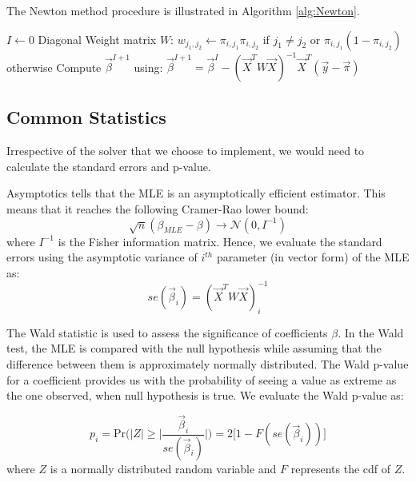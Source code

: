 The Newton method procedure is illustrated in Algorithm \ref{alg:Newton}.
\begin{algorithm}
\begin{algorithmic}[1]
    \State $I \leftarrow 0$
    \Repeat
        \State Diagonal Weight matrix $W$: $w_{j_1,j_2} \leftarrow \pi_{i,j_1}\pi_{i,j_2}$ if $j_1 \neq j_2$ or $\pi_{i,j_1}(1-\pi_{i,j_2})$ otherwise
        \State Compute $\vec{\beta}^{I+1}$  using:
        \State $\vec{\beta}^{I+1} =\vec{\beta}^{I} - (\vec{X}^{T} W \vec{X})^{-1} \vec{X}^{T} (\vec{y} - \vec{\pi}) $
\end{algorithmic}
\label{alg:Newton}
\end{algorithm}

\subsection{Common Statistics}\label{sec:stats}
Irrespective of the solver that we choose to implement, we would need to calculate the standard errors and p-value.

Asymptotics tells that the MLE is an asymptotically efficient estimator. This means that  it reaches the following Cramer-Rao lower bound:
\begin{equation}
\sqrt{n}(\beta_{MLE} - \beta) \rightarrow \mathcal{N}(0,I^{-1})
\end{equation}
where $I^{-1}$ is the Fisher information matrix. Hence, we evaluate the standard errors using  the asymptotic variance of $i^{th}$ parameter (in vector form) of the MLE as:
\begin{equation}
se(\vec{\beta}_i) = (\vec{X}^{T} W \vec{X})^{-1}_{i}
\end{equation}

The Wald statistic is used to assess the significance of coefficients $\beta$.
In the Wald test, the MLE is compared with the null hypothesis while assuming
that the difference between them is approximately normally distributed. The Wald
p-value for a coefficient provides us with the probability of seeing a value as
extreme as the one observed, when null hypothesis is true. We evaluate the Wald
p-value as:

\begin{equation}
p_i = \mbox{Pr}\Big(|Z| \geq \big|\frac{\vec{\beta}_i}{se(\vec{\beta}_i)} \big| \Big) = 2 \Big[1 - F(se(\vec{\beta}_i)) \Big]
\end{equation}
where $Z$ is a normally distributed random variable and $F$ represents the cdf of $Z$.


